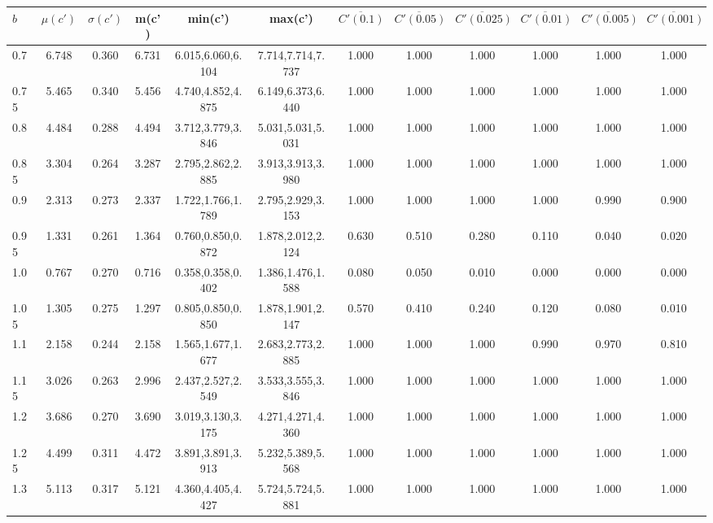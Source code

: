 \begin{table*}[h!]
\begin{center}
\begin{tabular}{| l | c | c | c | c | c | c | c | c | c | c | c |}\hline
$b$ & $\mu(c')$ & $\sigma(c')$ & m(c') & min(c') & max(c') & $\overline{C'(0.1)}$ & $\overline{C'(0.05)}$ & $\overline{C'(0.025)}$ & $\overline{C'(0.01)}$ & $\overline{C'(0.005)}$ & $\overline{C'(0.001)}$ \\\hline
0.7 & 6.748 & 0.360 & 6.731 & 6.015,6.060,6.104 & 7.714,7.714,7.737  & 1.000  & 1.000  & 1.000  & 1.000  & 1.000  & 1.000 \\\hline
0.75 & 5.465 & 0.340 & 5.456 & 4.740,4.852,4.875 & 6.149,6.373,6.440  & 1.000  & 1.000  & 1.000  & 1.000  & 1.000  & 1.000 \\\hline
0.8 & 4.484 & 0.288 & 4.494 & 3.712,3.779,3.846 & 5.031,5.031,5.031  & 1.000  & 1.000  & 1.000  & 1.000  & 1.000  & 1.000 \\\hline
0.85 & 3.304 & 0.264 & 3.287 & 2.795,2.862,2.885 & 3.913,3.913,3.980  & 1.000  & 1.000  & 1.000  & 1.000  & 1.000  & 1.000 \\\hline
0.9 & 2.313 & 0.273 & 2.337 & 1.722,1.766,1.789 & 2.795,2.929,3.153  & 1.000  & 1.000  & 1.000  & 1.000  & 0.990  & 0.900 \\\hline
0.95 & 1.331 & 0.261 & 1.364 & 0.760,0.850,0.872 & 1.878,2.012,2.124  & 0.630  & 0.510  & 0.280  & 0.110  & 0.040  & 0.020 \\\hline
1.0 & 0.767 & 0.270 & 0.716 & 0.358,0.358,0.402 & 1.386,1.476,1.588  & 0.080  & 0.050  & 0.010  & 0.000  & 0.000  & 0.000 \\\hline
1.05 & 1.305 & 0.275 & 1.297 & 0.805,0.850,0.850 & 1.878,1.901,2.147  & 0.570  & 0.410  & 0.240  & 0.120  & 0.080  & 0.010 \\\hline
1.1 & 2.158 & 0.244 & 2.158 & 1.565,1.677,1.677 & 2.683,2.773,2.885  & 1.000  & 1.000  & 1.000  & 0.990  & 0.970  & 0.810 \\\hline
1.15 & 3.026 & 0.263 & 2.996 & 2.437,2.527,2.549 & 3.533,3.555,3.846  & 1.000  & 1.000  & 1.000  & 1.000  & 1.000  & 1.000 \\\hline
1.2 & 3.686 & 0.270 & 3.690 & 3.019,3.130,3.175 & 4.271,4.271,4.360  & 1.000  & 1.000  & 1.000  & 1.000  & 1.000  & 1.000 \\\hline
1.25 & 4.499 & 0.311 & 4.472 & 3.891,3.891,3.913 & 5.232,5.389,5.568  & 1.000  & 1.000  & 1.000  & 1.000  & 1.000  & 1.000 \\\hline
1.3 & 5.113 & 0.317 & 5.121 & 4.360,4.405,4.427 & 5.724,5.724,5.881  & 1.000  & 1.000  & 1.000  & 1.000  & 1.000  & 1.000 \\\hline

\end{tabular}
\end{center}
\end{table*}
